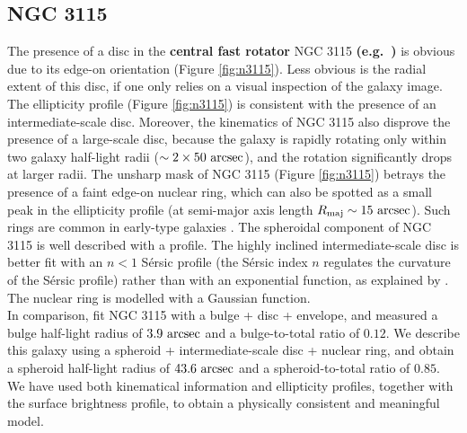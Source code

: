 \documentclass[useAMS,usenatbib,article]{mnras}
\begin{document}
\subsection{NGC 3115}
The presence of a disc in the {\bf central fast rotator} NGC 3115 
{\bf (e.g.~\citealt{strom1977,nieto1988,scorzabender1995}) }
is obvious due to its edge-on orientation (Figure \ref{fig:n3115}). 
Less obvious is the radial extent of this disc, if one only relies on a visual inspection of the galaxy image. 
The ellipticity profile (Figure \ref{fig:n3115}) is consistent with the presence of an intermediate-scale disc. 
Moreover, the kinematics of NGC 3115 \citep{arnold2011n3115} also disprove the presence of a large-scale disc, 
because the galaxy is rapidly rotating only within two galaxy half-light radii ($\sim 2 \times 50~\rm arcsec$), 
and the rotation significantly drops at larger radii.  
The unsharp mask of NGC 3115 (Figure \ref{fig:n3115}) betrays the presence of a faint edge-on nuclear ring, 
which can also be spotted as a small peak in the ellipticity profile 
(at semi-major axis length $R_{\rm maj} \sim 15~\rm arcsec$). 
Such rings are common in early-type galaxies \citep{michardmarchal1993}.
The spheroidal component of NGC 3115 is well described with a \cite{sersic1963} profile.
The highly inclined intermediate-scale disc is better fit with an $n<1$ S\'ersic profile 
(the S\'ersic index $n$ regulates the curvature of the S\'ersic profile) 
rather than with an exponential function, 
as explained by \cite{pastrav2013a}. 
The nuclear ring is modelled with a Gaussian function. \\
In comparison, \cite{lasker2014data} fit NGC 3115 with a bulge + disc + envelope, 
and measured a bulge half-light radius of $3.9~\rm arcsec$ and a bulge-to-total ratio of $0.12$. 
We describe this galaxy using a spheroid + intermediate-scale disc + nuclear ring, 
and obtain a spheroid half-light radius of $43.6~\rm arcsec$ and a spheroid-to-total ratio of $0.85$. 
We have used both kinematical information and ellipticity profiles, 
together with the surface brightness profile, 
to obtain a physically consistent and meaningful model. 
\end{document}
